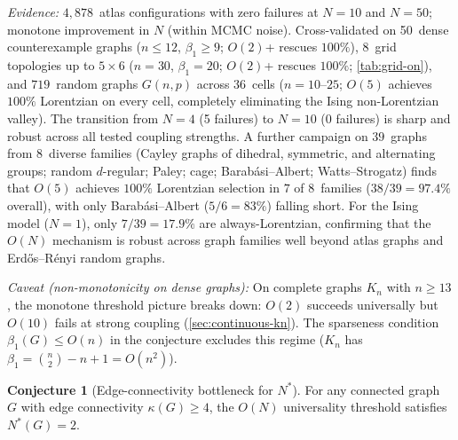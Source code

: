 \documentclass[11pt]{article}
\theoremstyle{definition}
\newtheorem{conjecture}[theorem]{Conjecture}
\theoremstyle{remark}
\begin{document}
\noindent\emph{Evidence:} $4{,}878$~atlas configurations with zero failures at $N = 10$
and $N = 50$; monotone improvement in $N$ (within MCMC noise).
Cross-validated on 50~dense counterexample graphs ($n \leq 12$,
$\beta_1 \geq 9$; $O(2)$+ rescues $100\%$), 8~grid topologies up to
$5 \times 6$ ($n = 30$, $\beta_1 = 20$; $O(2)$+ rescues $100\%$;
\cref{tab:grid-on}), and $719$~random graphs $G(n,p)$ across $36$~cells
($n = 10$--$25$; $O(5)$ achieves $100\%$ Lorentzian on every cell,
completely eliminating the Ising non-Lorentzian valley).
The transition from $N = 4$ (5 failures) to $N = 10$ (0 failures) is sharp
and robust across all tested coupling strengths.
A further campaign on $39$~graphs from $8$~diverse families
(Cayley graphs of dihedral, symmetric, and alternating groups;
random $d$-regular; Paley; cage; Barab\'{a}si--Albert; Watts--Strogatz)
finds that $O(5)$ achieves $100\%$ Lorentzian selection in $7$ of $8$~families
($38/39 = 97.4\%$ overall), with only Barab\'{a}si--Albert
($5/6 = 83\%$) falling short. For the Ising model ($N = 1$), only
$7/39 = 17.9\%$ are always-Lorentzian, confirming that the
$O(N)$ mechanism is robust across graph families well beyond
atlas graphs and Erd\H{o}s--R\'enyi random graphs.

\noindent\emph{Caveat (non-monotonicity on dense graphs):}
On complete graphs $K_n$ with $n \geq 13$, the monotone threshold
picture breaks down: $O(2)$ succeeds universally but $O(10)$ fails at
strong coupling (\cref{sec:continuous-kn}).  The sparseness condition
$\beta_1(G) \leq O(n)$ in the conjecture excludes this regime
($K_n$ has $\beta_1 = \binom{n}{2} - n + 1 = O(n^2)$).

\begin{conjecture}[Edge-connectivity bottleneck for $N^*$]
\label{conj:kappa-bottleneck}
For any connected graph~$G$ with edge connectivity $\kappa(G) \geq 4$,
the $O(N)$ universality threshold satisfies $N^*(G) = 2$.
\end{conjecture}
\end{document}

